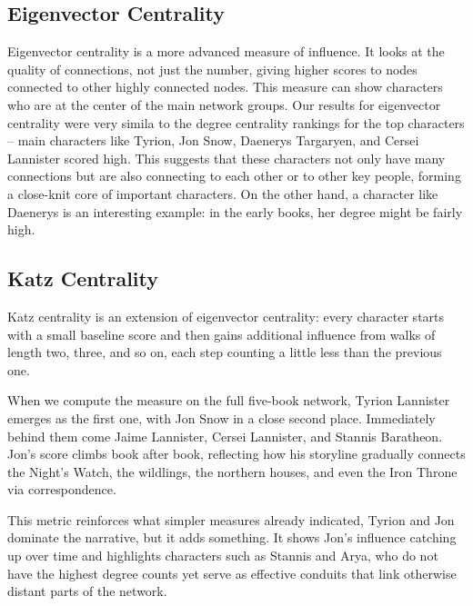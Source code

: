 \documentclass[12pt, a4paper]{article}
\begin{document}
\subsection*{Eigenvector Centrality}
Eigenvector centrality is a more advanced measure of influence.
 It looks at the quality of connections, not just the number, 
 giving higher scores to nodes connected to other highly connected nodes.
  This measure can show 
   characters who are at the center of the main network groups. 
   Our results for eigenvector centrality were very simila
    to the degree centrality rankings for the top characters 
    – main characters like Tyrion, Jon Snow, Daenerys Targaryen,
     and Cersei Lannister scored high. This suggests that 
     these characters not only have many connections but are also
      connecting to each other or to other key people, forming a 
      close-knit core of important characters. On the other hand,
       a character like Daenerys is an interesting example: in 
       the early books, her degree might be fairly high.

\subsection*{Katz Centrality}
Katz centrality is an extension of eigenvector centrality:
 every character starts with a small baseline score and then
  gains additional influence from walks of length two, three, 
  and so on, each step counting a little less than the previous one. 
  

When we compute the measure on the full five-book network, 
Tyrion Lannister emerges as the first one,
 with Jon Snow in a close second place. 
 Immediately behind them come Jaime Lannister, 
 Cersei Lannister, and Stannis Baratheon. Jon's score climbs book 
 after book, reflecting how his storyline gradually connects the 
 Night's Watch, the wildlings, the northern houses, and even the 
 Iron Throne via correspondence. 

This metric  reinforces what simpler measures already indicated, 
Tyrion and Jon dominate the narrative, but it adds something. 
It shows Jon's influence catching up over time and highlights 
characters such as Stannis and Arya, who do not have the 
highest degree counts yet serve as effective conduits that
 link otherwise distant parts of the network.
\end{document}
